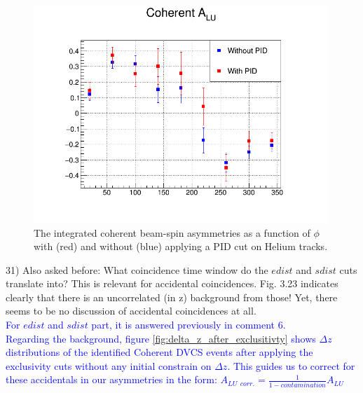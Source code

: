 \begin{figure}[tbp]
   \centering
\includegraphics[height=8.2cm]{fig/Coh_ALU_W_out_PID.png}
\caption{The integrated coherent beam-spin asymmetries as a function of 
$\phi$ with (red) and without (blue) applying a PID cut on Helium tracks.}
\label{fig:coh_alu_PID}
\end{figure}


31) Also asked before: What coincidence time window do the $edist$ and $sdist$ 
cuts translate into? This is relevant for accidental coincidences. Fig. 3.23 
indicates clearly that there is an uncorrelated (in z) background from those!  
Yet, there seems to be no discussion of accidental coincidences at all.\\
\textcolor{blue}{For $edist$ and $sdist$ part, it is answered previously in 
comment 6.}\\

\textcolor{blue}{ Regarding the background, figure 
\ref{fig:delta_z_after_exclusitivty} shows $\Delta z$ distributions of the 
identified Coherent DVCS events after applying the exclusivity cuts without any 
initial constrain on $\Delta z$.  This guides us to correct for these 
accidentals in our asymmetries in the form: $ A_{LU~~corr.} = \frac{1}{1 - 
contamination} A_{LU}$ }\\

